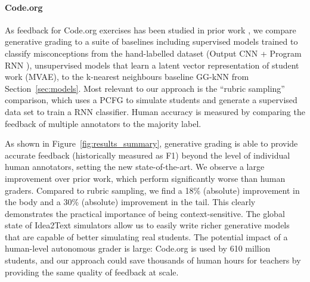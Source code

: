 \paragraph{Code.org}  As feedback for Code.org exercises has been studied in prior work \cite{wu2018zero}, we compare generative grading to a suite of baselines including supervised models trained to classify misconceptions from the hand-labelled dataset (Output CNN \cite{wang2017learning} + Program RNN \cite{wu2018zero}), unsupervised models that learn a latent vector representation of student work (MVAE), to the k-nearest neighbours baseline GG-kNN from Section~\ref{sec:models}. Most relevant to our approach is the ``rubric sampling'' \cite{wu2018zero} comparison, which uses a PCFG to simulate students and generate a supervised data set to train a RNN classifier. Human accuracy is measured by comparing the feedback of multiple annotators to the majority label.

As shown in Figure~\ref{fig:results_summary}, generative grading is able to provide accurate feedback (historically measured as F1) beyond the level of individual human annotators, setting the new state-of-the-art.
We observe a large improvement over prior work, which perform significantly worse than human graders. Compared to rubric sampling, we find a 18\% (absolute) improvement in the body and a 30\% (absolute) improvement in the tail. This clearly demonstrates the practical importance of being context-sensitive. The global state of Idea2Text simulators allow us to easily write richer generative models that are capable of better simulating real students. The potential impact of a human-level autonomous grader is large: Code.org is used by 610 million students, and our approach could save thousands of human hours for teachers by providing the same quality of feedback at scale.


